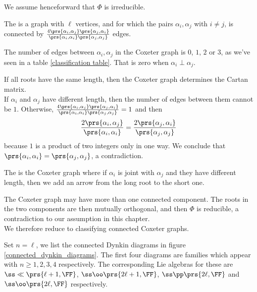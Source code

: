 \documentclass[10pt,a4paper,twoside,openany,hidelinks]{book}
\begin{document}
We assume henceforward that $\Phi$ is irreducible.

\begin{definition}
The  is a graph with $\ell$ vertices, and for which the pairs $\alpha_i, \alpha_j$ with $i\neq j$, is connected by $\frac{4 \prs{\alpha_i,\alpha_j} \prs{\alpha_j, \alpha_i}}{\prs{\alpha_i,\alpha_i} \prs{\alpha_j, \alpha_j}}$ edges.
\end{definition}
\begin{remark}
The number of edges between $\alpha_i, \alpha_j$ in the Coxeter graph is $0$, $1$, $2$ or $3$, as we've seen in a table \ref{classification table}.
That is zero when $\alpha_i \perp \alpha_j$.
\end{remark}

\begin{remark}
If all roots have the same length, then the Coxeter graph determines the Cartan matrix.\\
If $\alpha_i$ and $\alpha_j$ have different length, then the number of edges between them cannot be $1$. Otherwise, $\frac{4 \prs{\alpha_i,\alpha_j} \prs{\alpha_j, \alpha_i}}{\prs{\alpha_i,\alpha_i} \prs{\alpha_j, \alpha_j}} = 1$ and then \[\frac{2\prs{\alpha_i, \alpha_j}}{\prs{\alpha_i, \alpha_i}} = \frac{2\prs{\alpha_j, \alpha_i}}{\prs{\alpha_j, \alpha_j}}\]
because $1$ is a product of two integers only in one way. We conclude that $\prs{\alpha_i, \alpha_i} = \prs{\alpha_j, \alpha_j}$, a contradiction.
\end{remark}

\begin{definition}
The  is the Coxeter graph where if $\alpha_i$ is joint with $\alpha_j$ and they have different length, then we add an arrow from the long root to the short one.
\end{definition}

\begin{remark}
The Coxeter graph may have more than one connected component. The roots in the two components are then mutually orthogonal, and then $\Phi$ is reducible, a contradiction to our assumption in this chapter.\\
We therefore reduce to classifying connected Coxeter graphs.
\end{remark}

Set $n = \ell$, we list the connected Dynkin diagrams in figure \ref{connected_dynkin_diagrams}. The first four diagrams are families which appear with $n \geq 1,2,3,4$ respectively. The corresponding Lie algebras for these are $\ss\ll\prs{\ell+1, \FF}$, $\ss\oo\prs{2\ell + 1, \FF}$, $\ss\pp\prs{2\ell,\FF}$ and $\ss\oo\prs{2\ell, \FF}$ respectively.
\end{document}
